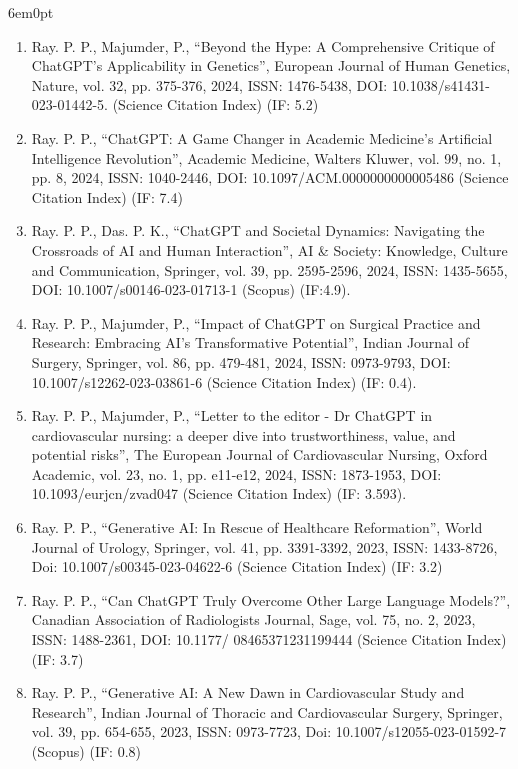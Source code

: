 \documentclass[11pt,a4paper]{moderncv}
\begin{document}
\begin{adjustwidth}{6em}{0pt}
\begin{enumerate}
		\item Ray. P. P., Majumder, P., “Beyond the Hype: A Comprehensive Critique of ChatGPT’s Applicability in Genetics”, European Journal of Human Genetics, Nature, vol. 32, pp. 375-376, 2024, ISSN: 1476-5438, DOI: 10.1038/s41431-023-01442-5. (Science Citation Index) (IF: 5.2)
		
		\item Ray. P. P., “ChatGPT: A Game Changer in Academic Medicine's Artificial Intelligence Revolution”, Academic Medicine, Walters Kluwer, vol. 99, no. 1, pp. 8, 2024, ISSN: 1040-2446, DOI: 10.1097/ACM.0000000000005486 (Science Citation Index) (IF: 7.4)
		
		\item Ray. P. P., Das. P. K., “ChatGPT and Societal Dynamics: Navigating the Crossroads of AI and Human Interaction”, AI \& Society: Knowledge, Culture and Communication, Springer, vol. 39, pp. 2595-2596, 2024, ISSN: 1435-5655, DOI: 10.1007/s00146-023-01713-1 (Scopus) (IF:4.9). 
		
		\item 	Ray. P. P., Majumder, P., “Impact of ChatGPT on Surgical Practice and Research: Embracing AI's Transformative Potential”, Indian Journal of Surgery, Springer, vol. 86, pp. 479-481, 2024, ISSN: 0973-9793, DOI: 10.1007/s12262-023-03861-6 (Science Citation Index) (IF: 0.4). 
		
		\item Ray. P. P., Majumder, P., “Letter to the editor - Dr ChatGPT in cardiovascular nursing: a deeper dive into trustworthiness, value, and potential risks”, The European Journal of Cardiovascular Nursing, Oxford Academic, vol. 23, no. 1, pp. e11-e12, 2024, ISSN: 1873-1953, DOI: 10.1093/eurjcn/zvad047 (Science Citation Index) (IF: 3.593). 
		
		\item Ray. P. P., “Generative AI: In Rescue of Healthcare Reformation”, World Journal of Urology, Springer, vol. 41, pp. 3391-3392, 2023, ISSN: 1433-8726, Doi: 10.1007/s00345-023-04622-6 (Science Citation Index) (IF: 3.2)
		
		\item Ray. P. P., “Can ChatGPT Truly Overcome Other Large Language Models?”, Canadian Association of Radiologists Journal, Sage, vol. 75, no. 2, 2023, ISSN: 1488-2361, DOI: 10.1177/ 08465371231199444 (Science Citation Index) (IF: 3.7)
		
		\item Ray. P. P., “Generative AI: A New Dawn in Cardiovascular Study and Research”, Indian Journal of Thoracic and Cardiovascular Surgery, Springer, vol. 39, pp. 654-655, 2023, ISSN: 0973-7723, Doi: 10.1007/s12055-023-01592-7 (Scopus) (IF: 0.8)
		

\end{enumerate}
\end{adjustwidth}
\end{document}
